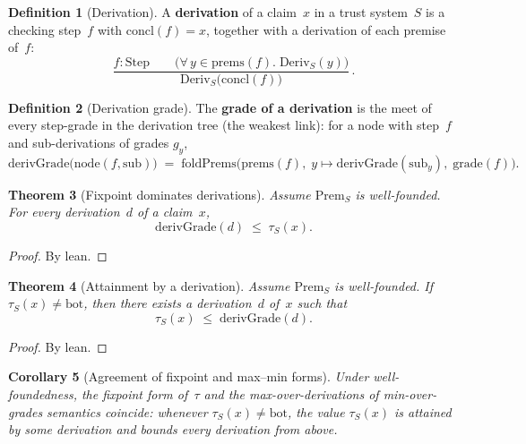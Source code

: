 \documentclass[11pt,a4paper]{article}
\theoremstyle{plain}
\newtheorem{theorem}{Theorem}[section]
\newtheorem{corollary}[theorem]{Corollary}
\theoremstyle{definition}
\newtheorem{definition}[theorem]{Definition}
\newcommand{\bott}{\mathrm{bot}}
\newcommand{\tauCan}{\tau}
\newcommand{\Prem}{\mathrm{Prem}}
\newcommand{\Deriv}{\mathrm{Deriv}}
\begin{document}
\begin{definition}[Derivation]\label{def:deriv}
A \textbf{derivation} of a claim~$x$ in a trust system~$S$ is a checking
step~$f$ with $\mathrm{concl}(f) = x$, together with a derivation of each
premise of~$f$:
\begin{equation}
  \frac{
    f : \mathrm{Step}
    \qquad
    \bigl(\forall\, y \in \mathrm{prems}(f).\;
      \Deriv_S(y)\bigr)
  }{
    \Deriv_S\bigl(\mathrm{concl}(f)\bigr)
  }\,.
\end{equation}
\end{definition}

\begin{definition}[Derivation grade]\label{def:derivgrade}
The \textbf{grade of a derivation} is the meet of every step-grade in the
derivation tree (the weakest link): for a node with step~$f$ and
sub-derivations of grades $g_y$,
\begin{equation}
  \mathrm{derivGrade}\bigl(\mathrm{node}(f, \mathrm{sub})\bigr)
  \;=\;
  \mathrm{foldPrems}\bigl(
    \mathrm{prems}(f),\;
    y \mapsto \mathrm{derivGrade}(\mathrm{sub}_y),\;
    \mathrm{grade}(f)
  \bigr).
\end{equation}
\end{definition}

\begin{theorem}[Fixpoint dominates derivations]\label{thm:deriv-le-tau}
Assume $\Prem_S$ is well-founded. For every derivation~$d$ of a claim~$x$,
\[
  \mathrm{derivGrade}(d) \;\le\; \tauCan_S(x).
\]
\end{theorem}

\begin{proof}
By lean.
\end{proof}

\begin{theorem}[Attainment by a derivation]\label{thm:tau-le-deriv}
Assume $\Prem_S$ is well-founded. If $\tauCan_S(x) \ne \bott$, then there
exists a derivation~$d$ of~$x$ such that
\[
  \tauCan_S(x) \;\le\; \mathrm{derivGrade}(d).
\]
\end{theorem}

\begin{proof}
By lean.
\end{proof}

\begin{corollary}[Agreement of fixpoint and max--min forms]
\label{cor:agree}
Under well-foundedness, the fixpoint form of~$\tau$ and the
max-over-derivations of min-over-grades semantics coincide: whenever
$\tauCan_S(x) \ne \bott$, the value $\tauCan_S(x)$ is attained by some
derivation and bounds every derivation from above.
\end{corollary}
\end{document}
